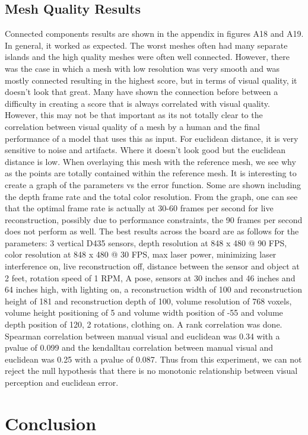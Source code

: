 \section{Mesh Quality Results}
Connected components results are shown in the appendix in figures A18 and A19. In general, it worked as expected. The worst meshes often had many separate islands and the high quality meshes were often well connected. However, there was the case in which a mesh with low resolution was very smooth and was mostly connected resulting in the highest score, but in terms of visual quality, it doesn't look that great. Many have shown the connection before between a difficulty in creating a score that is always correlated with visual quality. However, this may not be that important as its not totally clear to the correlation between visual quality of a mesh by a human and the final performance of a model that uses this as input.
For euclidean distance, it is very sensitive to noise and artifacts. Where it doesn't look good but the euclidean distance is low. When overlaying this mesh with the reference mesh, we see why as the points are totally contained within the reference mesh. It is interesting to create a graph of the parameters vs the error function. Some are shown including the depth frame rate and the total color resolution. From the graph, one can see that the optimal frame rate is actually at 30-60 frames per second for live reconstruction, possibly due to performance constraints, the 90 frames per second does not perform as well. The best results across the board are as follows for the parameters: 3 vertical D435 sensors, depth resolution at 848 x 480 @ 90 FPS, color resolution at 848 x 480 @ 30 FPS, max laser power, minimizing laser interference on, live reconstruction off, distance between the sensor and object at 2 feet, rotation speed of 1 RPM, A pose, sensors at 30 inches and 46 inches and 64 inches high, with lighting on, a reconstruction width of 100 and reconstruction height of 181 and reconstruction depth of 100, volume resolution of 768 voxels, volume height positioning of 5 and volume width position of -55 and volume depth position of 120, 2 rotations, clothing on. A rank correlation was done. Spearman correlation between manual visual and euclidean was 0.34 with a pvalue of 0.099 and the kendalltau correlation between manual visual and euclidean was 0.25 with a pvalue of 0.087. Thus from this experiment, we can not reject the null hypothesis that there is no monotonic relationship between visual perception and euclidean error.  
\chapter{Conclusion}

